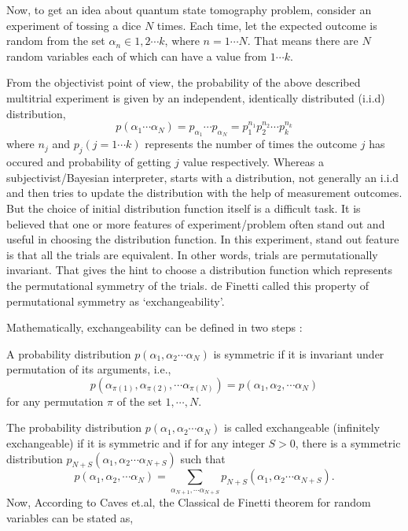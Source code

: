 Now, to get an idea about quantum state tomography problem, consider an experiment of tossing a dice $N$ times. Each time, let the expected outcome is random from the set $\alpha_{n} \in 1, 2 \cdots k$, where $n = 1 \cdots N$. That means there are $N$ random variables each of which can have a value from $1 \cdots k$.

From the objectivist point of view, the probability of the above described multitrial experiment is given by an independent, identically distributed (i.i.d) distribution,
$$
p(\alpha_{1} \cdots \alpha_{N}) = p_{\alpha_{1}} \cdots p_{\alpha_{N}} = p_{1}^{n_{1}} p_{2}^{n_{2}} \cdots p_{k}^{n_{k}}
$$ 
where $n_{j}$ and $p_{j} (j= 1 \cdots k)$ represents the number of times the outcome $j$ has occured and probability of getting $j$ value respectively. Whereas a  subjectivist/Bayesian interpreter, starts with a distribution, not generally an i.i.d and then tries to update the distribution with the help of measurement outcomes. But the choice of initial distribution function itself is a difficult task. It is believed that one or more features of experiment/problem often stand out and useful in choosing the distribution function. In this experiment, stand out feature is that all the trials are equivalent. In other words, trials are permutationally invariant. That gives the hint to choose a distribution function which represents the permutational symmetry of the trials. de Finetti called this property of permutational symmetry as `exchangeability'.

Mathematically, exchangeability can be defined in two steps :

A probability distribution $p(\alpha_{1}, \alpha_{2} \cdots \alpha_{N} )$ is symmetric if it is invariant under permutation of its arguments, i.e., 
$$ 
p(\alpha_{\pi(1)}, \alpha_{\pi(2)}, \cdots \alpha_{\pi(N)}) = p (\alpha_{1}, \alpha_{2}, \cdots \alpha_{N})
$$ 
for any permutation $\pi$ of the set $1, \cdots ,N$.

The probability distribution $p(\alpha_{1}, \alpha_{2} \cdots \alpha_{N})$ is called exchangeable (infinitely exchangeable) if it is symmetric and if for any integer $S > 0$, there is a symmetric distribution $p_{N+S} (\alpha_{1}, \alpha_{2} \cdots \alpha_{N+S})$ such that
$$ 
p(\alpha_{1}, \alpha_{2}, \cdots \alpha_{N}) = \sum_{\alpha_{N+1},\cdots \alpha_{N+S}} p_{N+S} (\alpha_{1}, \alpha_{2} \cdots \alpha_{N+S}).
$$
Now, According to Caves et.al\cite{chap16-key8}, the Classical de Finetti theorem for random variables can be stated as,

